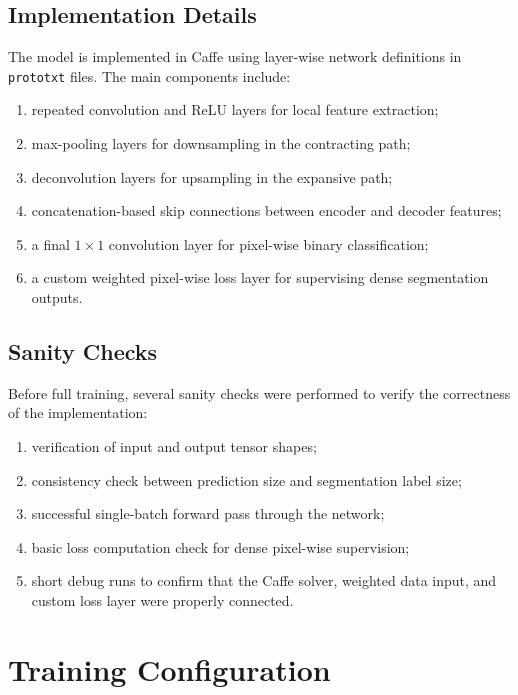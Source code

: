 \documentclass[11pt]{article}
\begin{document}
\subsection{Implementation Details}

The model is implemented in Caffe using layer-wise network definitions in \texttt{prototxt} files. The main components include:

\begin{enumerate}[leftmargin=1.5em]
    \item repeated convolution and ReLU layers for local feature extraction;
    \item max-pooling layers for downsampling in the contracting path;
    \item deconvolution layers for upsampling in the expansive path;
    \item concatenation-based skip connections between encoder and decoder features;
    \item a final \(1 \times 1\) convolution layer for pixel-wise binary classification;
    \item a custom weighted pixel-wise loss layer for supervising dense segmentation outputs.
\end{enumerate}

\subsection{Sanity Checks}

Before full training, several sanity checks were performed to verify the correctness of the implementation:

\begin{enumerate}[leftmargin=1.5em]
    \item verification of input and output tensor shapes;
    \item consistency check between prediction size and segmentation label size;
    \item successful single-batch forward pass through the network;
    \item basic loss computation check for dense pixel-wise supervision;
    \item short debug runs to confirm that the Caffe solver, weighted data input, and custom loss layer were properly connected.
\end{enumerate}

\section{Training Configuration}
\end{document}
